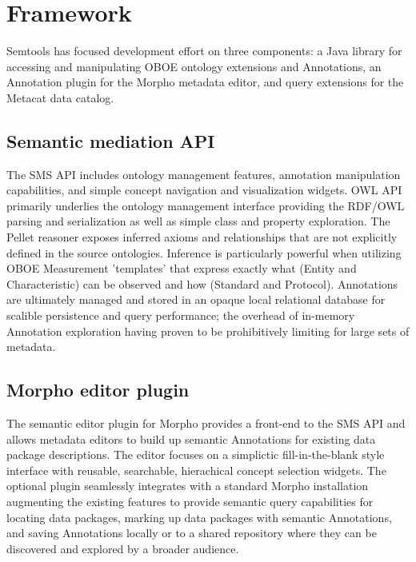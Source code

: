 \section{Framework}

Semtools has focused development effort on three components:
a Java library for accessing and manipulating OBOE ontology extensions and Annotations,
an Annotation plugin for the Morpho metadata editor, and query extensions for the Metacat data catalog.

\subsection{Semantic mediation API}
The SMS API includes ontology management features, annotation manipulation capabilities, and simple concept navigation and visualization widgets. OWL API primarily underlies the ontology management interface providing the RDF/OWL parsing and serialization as well as simple class and property exploration. The Pellet reasoner exposes inferred axioms and relationships that are not explicitly defined in the source ontologies. Inference is particularly powerful when utilizing OBOE Measurement 'templates' that express exactly what (Entity and Characteristic) can be observed and how (Standard and Protocol). 
Annotations are ultimately managed and stored in an opaque local relational database for scalible persistence and query performance; the overhead of in-memory Annotation exploration having proven to be prohibitively limiting for large sets of metadata. 

\subsection{Morpho editor plugin}
The semantic editor plugin for Morpho provides a front-end to the SMS API and allows metadata editors to build up semantic Annotations for existing data package descriptions. The editor focuses on a simplictic fill-in-the-blank style interface with reusable, searchable, hierachical concept selection widgets. The optional plugin seamlessly integrates with a standard Morpho installation augmenting the existing features to provide semantic query capabilities for locating data packages, marking up data packages with semantic Annotations, and saving Annotations locally or to a shared repository where they can be discovered and explored by a broader audience.

